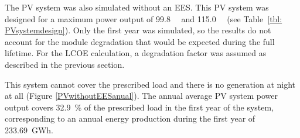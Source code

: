 The \ac{PV} system was also simulated without an \ac{EES}. This \ac{PV} system was designed for a maximum power output of \SI{99.8}{\mega\wattsac} and \SI{115.0}{\mega\wattsdc} (see Table~\ref{tbl: PVsystemdesign}). Only the first year was simulated, so the results do not account for the module degradation that would be expected during the full lifetime. For the \ac{LCOE} calculation, a degradation factor was assumed as described in the previous section. 


This system cannot cover the prescribed load and there is no generation at night at all (Figure \ref{PVwithoutEESanual}). The annual average \ac{PV} system power output covers \SI{32.9}{\percent} of the prescribed load in the first year of the system, corresponding to an annual energy production during the first year of \SI{233.69}{GWh}.


